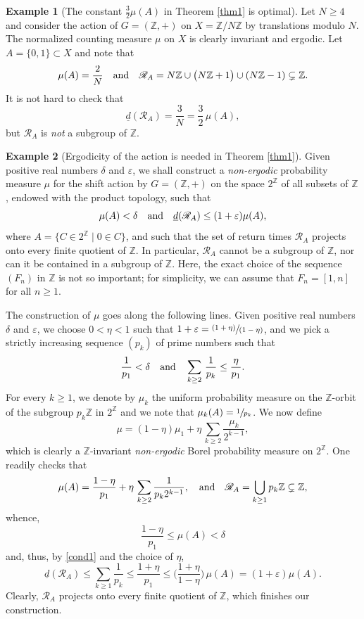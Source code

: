 \documentclass[JEP,XML,SOM,Unicode]{cedram}
\let\mathcal\mathscr
\newcommand{\pspfrac}[2]{\sfrac{(#1)}{(#2)}}
\newcommand{\cR}{\mathcal{R}}
\newcommand{\bZ}{\mathbb{Z}}
\newcommand{\qand}{\quad\textup{and}\quad}
\let\eps\varepsilon
\theoremstyle{plain}
\theoremstyle{definition}
\newtheorem{example}{Example}[section]
\begin{document}

\begin{example}[The constant $\frac{3}{2} \mu(A)$ in Theorem \ref{thm1} is optimal]
Let $N \geq 4$ and consider the action of $G = (\bZ,+)$ on $X = \bZ/N\bZ$ by translations modulo $N$. The normalized counting measure $\mu$
on $X$ is clearly invariant and ergodic. Let \hbox{$A\!=\!\{0,1\}\!\subset\!X$} and note that
\[
\mu(A) = \frac{2}{N} \qand \cR_{A} = N \bZ \cup \bigl(N\bZ + 1\bigr) \cup (N\bZ - 1) \subsetneq \bZ.
\]
It is not hard to check that
\[
\underline{d}(\cR_A) = \frac{3}{N} = \frac{3}{2}\, \mu(A),
\]
but $\cR_A$ is \emph{not} a subgroup of $\bZ$.
\end{example}

\begin{example}[Ergodicity of the action is needed in Theorem \ref{thm1}]
Given positive real numbers $\delta$ and $\eps$, we shall construct a \emph{non-ergodic} probability measure
$\mu$ for the shift action by $G = (\bZ,+)$ on the space $2^\bZ$ of all subsets of $\bZ$, endowed with the product topology, such that
\[
\mu(A) < \delta \qand \underline{d}(\cR_A) \leq (1+\eps)\mu(A),
\]
where $A = \{ C \in 2^\bZ \mid  0 \in C\}$, and such that the set of return times $\cR_A$ projects onto every finite quotient of $\bZ$. In
particular, $\cR_A$ cannot be a subgroup of $\bZ$, nor can it be contained in a subgroup of $\bZ$.
Here, the exact choice of the sequence $(F_n)$ in $\bZ$ is not so important; for simplicity, we can assume that $F_n = [1,n]$ for all $n \geq 1$.

The construction of $\mu$ goes along the following lines. Given positive real numbers~$\delta$ and $\eps$, we choose $0 < \eta < 1$ such that
$1 + \eps = \pspfrac{1+\eta}{1-\eta}$, and we pick a strictly increasing sequence $(p_k)$ of prime numbers such that
\begin{equation}
\label{cond1}
\frac{1}{p_1} < \delta \qand \sum_{k \geq 2} \, \frac{1}{p_k} \leq \frac{\eta}{p_1}.
\end{equation}
For every $k \geq 1$, we denote by $\mu_k$ the uniform probability measure on the $\bZ$-orbit of the subgroup $p_k \bZ$ in $2^{\bZ}$ and we note
that $\mu_k(A) = \sfrac{1}{p_k}$. We now define
\[
\mu = (1-\eta)\mu_1 + \eta \, \sum_{k \geq 2} \frac{\mu_k}{2^{k-1}},
\]
which is clearly a $\bZ$-invariant \emph{non-ergodic} Borel probability measure on $2^{\bZ}$. One readily checks that
\[
\mu(A) = \frac{1-\eta}{p_1} + \eta \, \sum_{k \geq 2} \frac{1}{p_k 2^{k-1}},
\qand
\cR_A = \bigcup_{k \geq 1} p_k \bZ \subsetneq \bZ,
\]
whence,
\[
\frac{1-\eta}{p_1} \leq \mu(A) < \delta
\]
and, thus, by \eqref{cond1} and the choice of $\eta$,
\[
\underline{d}(\cR_A) \leq \sum_{k \geq 1} \frac{1}{p_k} \leq \frac{1+\eta}{p_1} \leq \Big( \frac{1+\eta}{1-\eta} \Big) \, \mu(A) = (1+\eps)\mu(A).
\]
Clearly, $\cR_A$ projects onto every finite quotient of $\bZ$, which finishes our construction.
\end{example}
\end{document}
